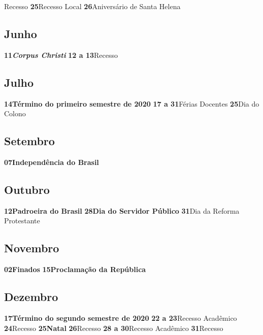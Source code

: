 \documentclass[thesis]{hmcposter}
\begin{document}
\begin{poster}
Recesso \newline\textbf{25}\quad \quad \quad \quad Recesso Local \newline\textbf{26}\quad \quad \quad \quad Aniversário de Santa Helena \newline\subsection{Junho}\textbf{11}\quad \quad \quad \quad \textbf{\textit{Corpus Christi}} \newline\textbf{12 a 13}\quad \quad Recesso \newline\subsection{Julho}\textbf{14}\quad \quad \quad \quad \textbf{Término do primeiro semestre de 2020} \newline\textbf{17 a 31}\quad \quad Férias Docentes \newline\textbf{25}\quad \quad \quad \quad Dia do Colono \newline\subsection{Setembro}\textbf{07}\quad \quad \quad \quad \textbf{Independência do Brasil} \newline\subsection{Outubro}\textbf{12}\quad \quad \quad \quad \textbf{Padroeira do Brasil} \newline\textbf{28}\quad \quad \quad \quad \textbf{Dia do Servidor Público} \newline\textbf{31}\quad \quad \quad \quad Dia da Reforma Protestante \newline\subsection{Novembro}\textbf{02}\quad \quad \quad \quad \textbf{Finados} \newline\textbf{15}\quad \quad \quad \quad \textbf{Proclamação da República} \newline\subsection{Dezembro}\textbf{17}\quad \quad \quad \quad \textbf{Término do segundo semestre de 2020} \newline\textbf{22 a 23}\quad \quad Recesso Acadêmico \newline\textbf{24}\quad \quad \quad \quad Recesso \newline\textbf{25}\quad \quad \quad \quad \textbf{Natal} \newline\textbf{26}\quad \quad \quad \quad Recesso \newline\textbf{28 a 30}\quad \quad Recesso Acadêmico \newline\textbf{31}\quad \quad \quad \quad Recesso \newline\newpage

\end{poster}
\end{document}
